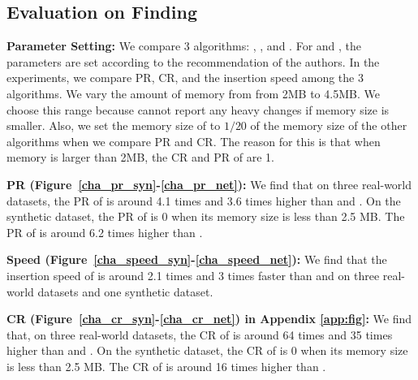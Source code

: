 





\subsection{Evaluation on Finding \taskfour} %
\label{eva_four}

\noindent\textbf{Parameter Setting:}
%
We compare 3 algorithms: \sketchname, \chafr\cite{flowradar}, and \chafrcf\cite{coldfilter}.
For \chafr{} and \chafrcf, the parameters are set according to the recommendation of the authors.
In the experiments, we compare PR, CR, and the insertion speed among the 3 algorithms. We vary the amount of memory from from 2MB to 4.5MB. We choose this range because \chafr{} cannot report any heavy changes if memory size is smaller. Also, we set the memory size of \sketchname{} to $1/20$ of the memory size of the other algorithms when we compare PR and CR. The reason for this is that when memory is larger than 2MB, the CR and PR of \sketchname{} are 1. 


\noindent\textbf{PR (Figure~\ref{cha_pr_syn}-\ref{cha_pr_net}):}
We find that on three real-world datasets, the PR of \sketchname{} is around 4.1 times and 3.6 times higher than \chafr{} and \chafrcf. 
On the synthetic dataset, the PR of \chafr{} is 0 when its memory size is less than 2.5 MB. The PR of \sketchname{} is around 6.2 times higher than \chafrcf. 
			
			
\noindent\textbf{Speed (Figure~\ref{cha_speed_syn}-\ref{cha_speed_net}):}
We find that the insertion speed of \sketchname{} is around 2.1 times and 3 times faster than \chafr{} and \chafrcf{} on three real-world datasets and one synthetic dataset.

\noindent\textbf{CR (Figure~\ref{cha_cr_syn}-\ref{cha_cr_net}) in Appendix \ref{app:fig}:}
We find that, on three real-world datasets, the CR of \sketchname{} is around 64 times and 35 times higher than \chafr{} and \chafrcf. 
On the synthetic dataset, the CR of \chafr{} is 0 when its memory size is less than 2.5 MB. The CR of \sketchname{} is around 16 times higher than \chafrcf. 


